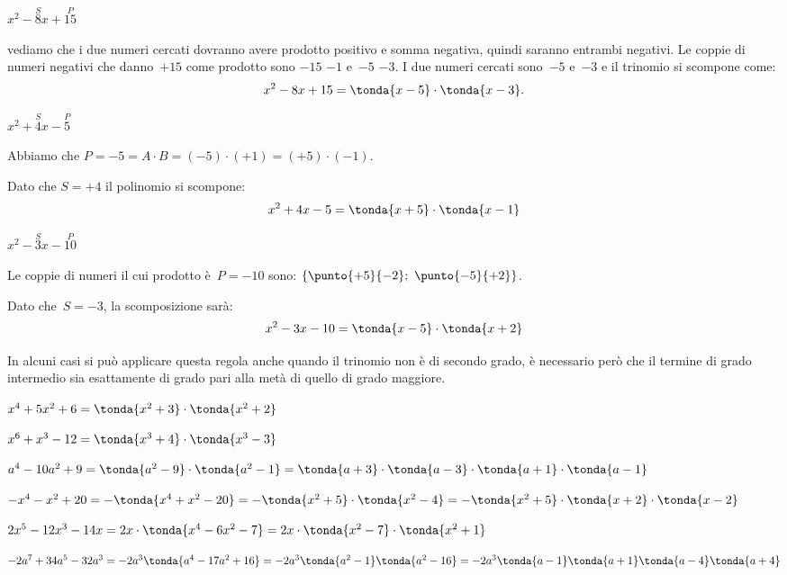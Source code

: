  \begin{esempio}
 \(x^2-\overset{S}{8}x+\overset{P}{15}\)

vediamo che i due numeri cercati dovranno avere 
prodotto positivo e somma negativa, quindi saranno entrambi negativi. 
Le coppie di numeri negativi che danno~\(+15\) come prodotto sono \(-15\) 
\(-1\) e~\(-5\) \(-3\).
I due numeri cercati sono~\(-5\) e~\(-3\) e il trinomio si scompone come:
\[x^2-8x+15=\tonda{x-5}\cdot \tonda{x-3}.\]
 \end{esempio}


\begin{esempio}
 \(x^2+\overset{S}{4}x-\overset{P}{5}\)

Abbiamo che \(P = -5 = A \cdot B = (-5) \cdot (+1) = (+5) \cdot (-1)\).

Dato che \(S = +4\) il polinomio si scompone:
\[x^2+4x-5=\tonda{x+5}\cdot \tonda{x-1}\]
\end{esempio}

\begin{esempio}
 \(x^2-\overset{S}{3}x-\overset{P}{10}\)

Le coppie di numeri il cui prodotto è~\(P=-10\) sono:
\(\{\punto{+5}{-2};~\punto{-5}{+2}\}\).

Dato che~\(S=-3\), la scomposizione sarà:
\[x^2-3x-10=\tonda{x-5}\cdot \tonda{x+2}\]
\end{esempio}

\begin{esempio}
 In alcuni casi si può applicare questa regola anche quando il trinomio
non è di secondo grado, è necessario però che il termine di grado
intermedio sia esattamente di grado pari alla metà di quello di grado
maggiore.

\begin{itemize*}
\item \(x^4+5x^2+6=\tonda{x^2+3}\cdot \tonda{x^2+2}\)
\item \(x^6+x^3-12=\tonda{x^3+4}\cdot \tonda{x^3-3}\)
\item \(a^{4}-10a^{2}+9=\tonda{a^{2}-9}\cdot\tonda{a^{2}-1}=
       \tonda{a+3}\cdot \tonda{a-3}\cdot 
       \tonda{a+1}\cdot\tonda{a-1}\)
\item \(-x^4-x^2+20=-\tonda{x^4+x^2-20}=
       -\tonda{x^2+5}\cdot\tonda{x^2-4}=
       -\tonda{x^2+5}\cdot\tonda{x+2}\cdot \tonda{x-2}\)
\item \(2x^{5}-12x^3-14x=2x\cdot \tonda{x^4-6x^2-7}=2x\cdot%
\tonda{x^2-7}\cdot \tonda{x^2+1}\)
\item \(-2a^{7}+34a^{5}-32a^{3}=-2a^{3}\tonda{a^{4}-17a^{2}+16}
    =-2a^{3}\tonda{a^{2}-1}\tonda{a^{2}-16}\\
=-2a^{3}\tonda{a-1}\tonda{a+1}\tonda{a-4}\tonda{a+4}\)
\end{itemize*}
\end{esempio}

